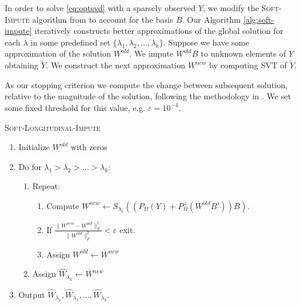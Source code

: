 \documentclass[preprint]{imsart}
\numberwithin{equation}{section}
\theoremstyle{plain}
\begin{document}
In order to solve \eqref{eq:optsvd} with a sparsely observed  $Y$, we modify the \textsc{Soft-Impute} algorithm from \citep{mazumder2010spectral} to account for the basis $B$. Our Algorithm \ref{alg:soft-impute} iteratively constructs better approximations of the global solution for each $\lambda$ in some predefined set $\{\lambda_1, \lambda_2, ..., \lambda_k\}$. Suppose we have some approximation of the solution $W^{old}$. We impute $W^{old}B$ to unknown elements of $Y$ obtaining $\tilde{Y}$. We construct the next approximation $W^{new}$ by computing SVT of $\tilde{Y}$.

As our stopping criterion we compute the change between subsequent solution, relative to the magnitude of the solution, following the methodology in \cite{cai2010singular}. We set some fixed threshold for this value, e.g. $\varepsilon = 10^{-4}$.

\begin{algorithm}
\caption{\textsc{Soft-Longitudinal-Impute}\label{alg:soft-impute}}
\begin{enumerate}
\item Initialize $W^{old}$ with zeros
\item Do for $\lambda_1 > \lambda_2 > ... > \lambda_k$:
\begin{enumerate}
\item Repeat:
\begin{enumerate}
\item Compute $W^{new} \leftarrow S_{\lambda_k}( (P_\Omega(Y) + P_\Omega^\perp(W^{old}B'))B )$.
\item If $\frac{\|W^{new} - W^{old}\|_F^2}{\|W^{old}\|_F^2} < \varepsilon$ exit.
\item Assign $W^{old} \leftarrow W^{new}$
\end{enumerate}
\item Assign $\hat{W}_{\lambda_k} \leftarrow W^{new}$
\end{enumerate}
\item Output $\hat{W}_{\lambda_1}, \hat{W}_{\lambda_2}, ... , \hat{W}_{\lambda_k}$.
\end{enumerate}
\end{algorithm}
\end{document}
